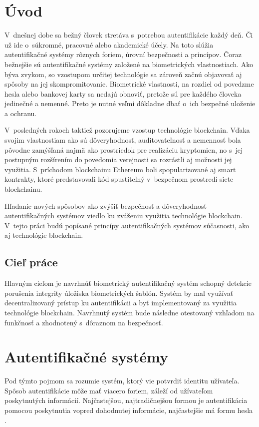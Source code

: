 \chapter{Úvod}

V~dnešnej dobe sa bežný človek stretáva s~potrebou autentifikácie každý deň. Či už ide o~súkromné, pracovné alebo akademické účely. Na toto slúžia autentifikačné systémy rôznych foriem, úrovní bezpečnosti a princípov. Čoraz bežnejšie sú autentifikačné systémy založené na biometrických vlastnostiach. Ako býva zvykom, so vzostupom určitej technológie sa zároveň začnú objavovať aj spôsoby na jej skompromitovanie. Biometrické vlastnosti, na rozdiel od povedzme hesla alebo bankovej karty sa nedajú obnoviť, pretože sú pre každého človeka jedinečné a nemenné. Preto je nutné veľmi dôkladne dbať o~ich bezpečné uloženie a ochranu.

V~posledných rokoch taktiež pozorujeme vzostup technológie blockchain. Vďaka svojim vlastnostiam ako sú dôveryhodnosť, auditovateľnosť a nemennosť bola pôvodne zamýšľaná najmä ako prostriedok pre realizáciu kryptomien, no s~jej postupným rozšírením do povedomia verejnosti sa rozrástli aj možnosti jej využitia. S~príchodom blockchainu Ethereum boli spopularizované aj smart kontrakty, ktoré predstavovali kód spustiteľný v~bezpečnom prostredí siete blockchainu.

Hľadanie nových spôsobov ako zvýšiť bezpečnosť a dôveryhodnosť autentifikačných systémov viedlo ku zváženiu využitia technológie blockchain. V~tejto práci budú popísané princípy autentifikačných systémov súčasnosti, ako aj technológie blockchain.

\section{Cieľ práce}
Hlavným cieľom je navrhnúť biometrický autentifikačný systém schopný detekcie porušenia integrity úložiska biometrických šablón. Systém by mal využívať decentralizovaný prístup ku autentifikácii a byť implementovaný za využitia technológie blockchain. Navrhnutý systém bude následne otestovaný vzhľadom na funkčnosť a zhodnotený s~dôraznom na bezpečnosť.


\chapter{Autentifikačné systémy}
Pod týmto pojmom sa rozumie systém, ktorý vie potvrdiť identitu užívateľa. Spôsob autentifikácie môže mať viacero foriem, záleží od užívateľom poskytnutých informácií. Najčastejšou, najtradičnejšou formou je autentifikácia pomocou poskytnutia vopred dohodnutej informácie, najčastejšie má formu hesla \cite{authentication_systems1}.

